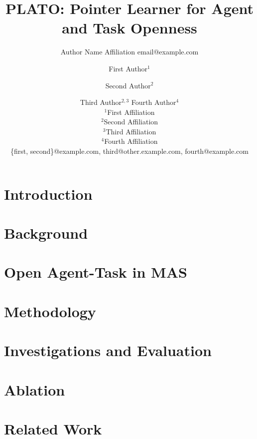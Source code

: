 \documentclass{article}
\title{PLATO: Pointer Learner for Agent and Task Openness}
\author{
    Author Name
    \affiliations
    Affiliation
    \emails
    email@example.com
}
\author{
First Author$^1$
\and
Second Author$^2$\and
Third Author$^{2,3}$\And
Fourth Author$^4$\\
\affiliations
$^1$First Affiliation\\
$^2$Second Affiliation\\
$^3$Third Affiliation\\
$^4$Fourth Affiliation\\
\emails
\{first, second\}@example.com,
third@other.example.com,
fourth@example.com
}
\begin{document}
\maketitle
\begin{abstract}


\end{abstract}



\section{Introduction}\label{sec:introduction}


\section{Background}\label{sec:background}


\section{Open Agent-Task in MAS}\label{sec:open-mas}



\section{Methodology}\label{sec:methodology}


\section{Investigations and Evaluation}\label{sec:experiments}


\section{Ablation}\label{sec:ablation}


\section{Related Work}\label{sec:related}

\end{document}
